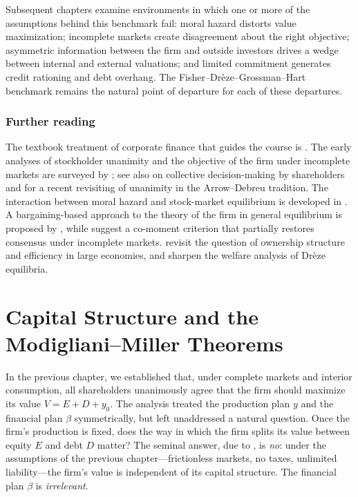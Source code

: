 \documentclass[11pt,a4paper,oneside]{book}
\theoremstyle{plain}
\theoremstyle{definition}
\theoremstyle{remark}
\numberwithin{equation}{chapter}
\begin{document}
Subsequent chapters examine environments in which one or more of the assumptions behind this benchmark fail: moral hazard distorts value maximization; incomplete markets create disagreement about the right objective; asymmetric information between the firm and outside investors drives a wedge between internal and external valuations; and limited commitment generates credit rationing and debt overhang.
The Fisher--Drèze--Grossman--Hart benchmark remains the natural point of departure for each of these departures.

\subsection{Further reading}

The textbook treatment of corporate finance that guides the course is \citet{Tirole2006}.
The early analyses of stockholder unanimity and the objective of the firm under incomplete markets are surveyed by \citet{KelseyMilne1996}; see also \citet{TvedeCres2005} on collective decision-making by shareholders and \citet{CarcelesCoenPirani2009} for a recent revisiting of unanimity in the Arrow--Debreu tradition.
The interaction between moral hazard and stock-market equilibrium is developed in \citet{MagillQuinzii2008}.
A bargaining-based approach to the theory of the firm in general equilibrium is proposed by \citet{BritzHeringsPredtetchinski2013}, while \citet{MagillQuinzii2010} suggest a co-moment criterion that partially restores consensus under incomplete markets.
\citet{BejanBidian2012} revisit the question of ownership structure and efficiency in large economies, and \citet{DierkerDierker2010} sharpen the welfare analysis of Drèze equilibria.

\chapter{Capital Structure and the Modigliani--Miller Theorems}
\label{ch:capital-structure}

In the previous chapter, we established that, under complete markets and interior consumption, all shareholders unanimously agree that the firm should maximize its value $V = E + D + y_0$.
The analysis treated the production plan $y$ and the financial plan $\beta$ symmetrically, but left unaddressed a natural question.
Once the firm's production is fixed, does the way in which the firm splits its value between equity $E$ and debt $D$ matter?
The seminal answer, due to \citet{ModiglianiMiller1958}, is \emph{no}: under the assumptions of the previous chapter---frictionless markets, no taxes, unlimited liability---the firm's value is independent of its capital structure.
The financial plan $\beta$ is \emph{irrelevant}.
\end{document}
